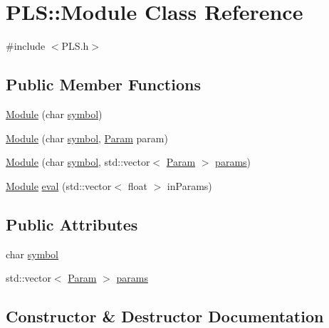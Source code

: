 \hypertarget{class_p_l_s_1_1_module}{}\section{P\+LS\+:\+:Module Class Reference}
\label{class_p_l_s_1_1_module}


{\ttfamily \#include $<$P\+L\+S.\+h$>$}

\subsection*{Public Member Functions}
\begin{DoxyCompactItemize}
\item 
\hyperlink{class_p_l_s_1_1_module_a5ef6b2ef2146e3b676f9f09aa89eb7e6}{Module} (char \hyperlink{class_p_l_s_1_1_module_aff9d7d8f68f2574de9355e7c23bc55b2}{symbol})
\item 
\hyperlink{class_p_l_s_1_1_module_aff9927b4ecd59e3b47982a8b636e2e0b}{Module} (char \hyperlink{class_p_l_s_1_1_module_aff9d7d8f68f2574de9355e7c23bc55b2}{symbol}, \hyperlink{class_p_l_s_1_1_param}{Param} param)
\item 
\hyperlink{class_p_l_s_1_1_module_a1e45439bc8ad04b70894076db8400cf2}{Module} (char \hyperlink{class_p_l_s_1_1_module_aff9d7d8f68f2574de9355e7c23bc55b2}{symbol}, std\+::vector$<$ \hyperlink{class_p_l_s_1_1_param}{Param} $>$ \hyperlink{class_p_l_s_1_1_module_aacac04d530bfdfd688dfa0abe4654f4b}{params})
\item 
\hyperlink{class_p_l_s_1_1_module}{Module} \hyperlink{class_p_l_s_1_1_module_a6dea01da9bc678170fe0397462926a33}{eval} (std\+::vector$<$ float $>$ in\+Params)
\end{DoxyCompactItemize}
\subsection*{Public Attributes}
\begin{DoxyCompactItemize}
\item 
char \hyperlink{class_p_l_s_1_1_module_aff9d7d8f68f2574de9355e7c23bc55b2}{symbol}
\item 
std\+::vector$<$ \hyperlink{class_p_l_s_1_1_param}{Param} $>$ \hyperlink{class_p_l_s_1_1_module_aacac04d530bfdfd688dfa0abe4654f4b}{params}
\end{DoxyCompactItemize}


\subsection{Constructor \& Destructor Documentation}
